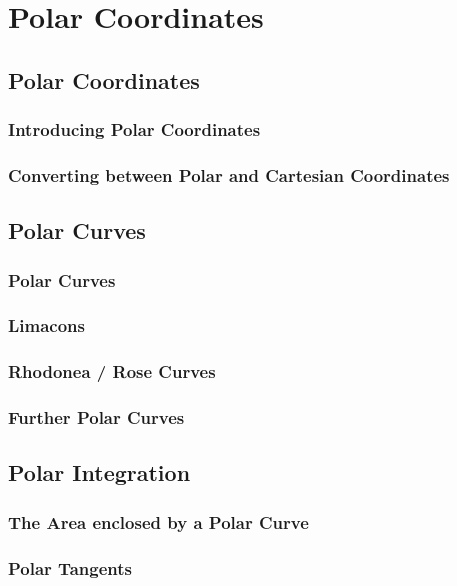 \documentclass[../alevelmaths.tex]{subfiles}
\begin{document}
\chapter{Polar Coordinates}
\section{Polar Coordinates}
\subsection*{Introducing Polar Coordinates}
\subsection*{Converting between Polar and Cartesian Coordinates}
\section{Polar Curves}
\subsection*{Polar Curves}
\subsection*{Limacons}
\subsection*{Rhodonea / Rose Curves}
\subsection*{Further Polar Curves}
\section{Polar Integration}
\subsection*{The Area enclosed by a Polar Curve}
\subsection*{Polar Tangents}
\end{document}
